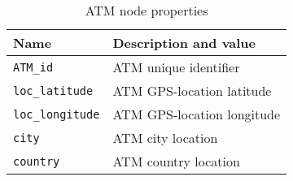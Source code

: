 \begin{table}[H]
    \centering
    \begin{tabular}{|l|l|}
    \hline
    \textbf{Name}        & \textbf{Description and value}                                      \\ \hline
    \texttt{ATM\_id}      & ATM unique identifier                             \\ \hline
    \texttt{loc\_latitude}  & ATM GPS-location latitude           \\ \hline
    \texttt{loc\_longitude} & ATM GPS-location longitude          \\ \hline
    \texttt{city}         & ATM city location                         \\ \hline
    \texttt{country}      & ATM country location                       \\ \hline
    \end{tabular}
    \caption{ATM node properties}
    \label{table:atm-node-properties}
\end{table}